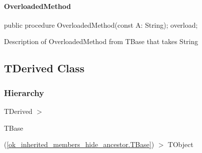 \documentclass{report}
\newif\ifpdf
\begin{document}
\paragraph*{OverloadedMethod}\hspace*{\fill}

\label{ok_inherited_members_hide_ancestor.TBase-OverloadedMethod}
\begin{list}{}{
\setlength{\itemindent}{0cm}
\setlength{\listparindent}{0cm}
\setlength{\leftmargin}{\evensidemargin}
\addtolength{\leftmargin}{\tmplength}
\settowidth{\labelsep}{X}
\addtolength{\leftmargin}{\labelsep}
\setlength{\labelwidth}{\tmplength}
}
\item[\textbf{Declaration}\hfill]
\ifpdf
\begin{flushleft}
\fi
\begin{ttfamily}
public procedure OverloadedMethod(const A: String); overload;\end{ttfamily}

\ifpdf
\end{flushleft}
\fi

\par
\item[\textbf{Description}]
Description of OverloadedMethod from TBase that takes String

\end{list}
\ifpdf
\subsection*{\large{\textbf{TDerived Class}}\normalsize\hspace{1ex}\hrulefill}
\else
\subsection*{TDerived Class}
\fi
\label{ok_inherited_members_hide_ancestor.TDerived}
\subsubsection*{\large{\textbf{Hierarchy}}\normalsize\hspace{1ex}\hfill}
TDerived {$>$} \begin{ttfamily}TBase\end{ttfamily}(\ref{ok_inherited_members_hide_ancestor.TBase}) {$>$} 
TObject
\end{document}

